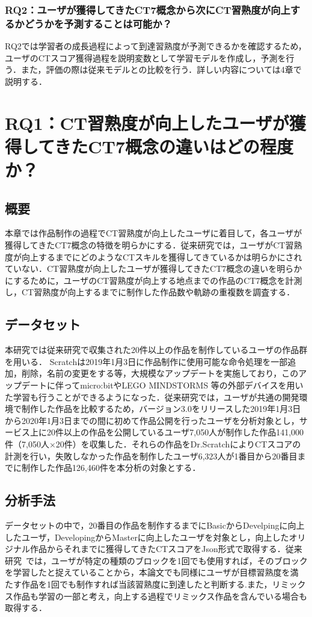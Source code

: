 \documentclass[11pt,dvipdfmx]{jreport}
\begin{document}
\subsection{RQ2：ユーザが獲得してきたCT7概念から次にCT習熟度が向上するかどうかを予測することは可能か？}
RQ2では学習者の成長過程によって到達習熟度が予測できるかを確認するため，ユーザのCTスコア獲得過程を説明変数として学習モデルを作成し，予測を行う．また，評価の際は従来モデルとの比較を行う．詳しい内容については4章で説明する．

\chapter{RQ1：CT習熟度が向上したユーザが獲得してきたCT7概念の違いはどの程度か？}\label{sec:chapter_3}
\section{概要}
本章では作品制作の過程でCT習熟度が向上したユーザに着目して，各ユーザが獲得してきたCT7概念の特徴を明らかにする．従来研究では，ユーザがCT習熟度が向上するまでにどのようなCTスキルを獲得してきているかは明らかにされていない．CT習熟度が向上したユーザが獲得してきたCT7概念の違いを明らかにするために，ユーザのCT習熟度が向上する地点までの作品のCT7概念を計測し，CT習熟度が向上するまでに制作した作品数や軌跡の重複数を調査する．
\section{データセット}\label{sec:chapter_3-1}
本研究では従来研究で収集された20件以上の作品を制作しているユーザの作品群を用いる．
Scratchは2019年1月3日に作品制作に使用可能な命令処理を一部追加，削除，名前の変更をする等，大規模なアップデートを実施しており，このアップデートに伴ってmicro:bitやLEGO MINDSTORMS 等の外部デバイスを用いた学習も行うことができるようになった．従来研究では，ユーザが共通の開発環境で制作した作品を比較するため，バージョン3.0をリリースした2019年1月3日から2020年1月3日までの間に初めて作品公開を行ったユーザを分析対象とし，サービス上に20件以上の作品を公開しているユーザ7,050人が制作した作品141,000件（7,050人×20件）を収集した．それらの作品をDr.ScratchによりCTスコアの計測を行い，失敗しなかった作品を制作したユーザ6,323人が1番目から20番目までに制作した作品126,460件を本分析の対象とする．
\section{分析手法}
データセットの中で，20番目の作品を制作するまでにBasicからDevelpingに向上したユーザ，DevelopingからMasterに向上したユーザを対象とし，向上したオリジナル作品からそれまでに獲得してきたCTスコアをJson形式で取得する．従来研究~\cite{Ando_2021}では，ユーザが特定の種類のブロックを1回でも使用すれば，そのブロックを学習したと捉えていることから，本論文でも同様にユーザが目標習熟度を満 たす作品を1回でも制作すれば当該習熟度に到達したと判断する.また，リミックス作品も学習の一部と考え，向上する過程でリミックス作品を含んでいる場合も取得する．
\end{document}
